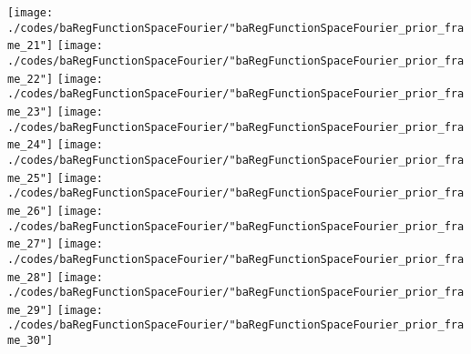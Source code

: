 \begin{frame}{\insertsection}
\begin{center}
{\begin{animateinline}{20}
				 \texttt{[image: ./codes/baRegFunctionSpaceFourier/"baRegFunctionSpaceFourier\_prior\_frame\_21"]}\newframe
				 \texttt{[image: ./codes/baRegFunctionSpaceFourier/"baRegFunctionSpaceFourier\_prior\_frame\_22"]}\newframe
				 \texttt{[image: ./codes/baRegFunctionSpaceFourier/"baRegFunctionSpaceFourier\_prior\_frame\_23"]}\newframe
				 \texttt{[image: ./codes/baRegFunctionSpaceFourier/"baRegFunctionSpaceFourier\_prior\_frame\_24"]}\newframe
				 \texttt{[image: ./codes/baRegFunctionSpaceFourier/"baRegFunctionSpaceFourier\_prior\_frame\_25"]}\newframe
				 \texttt{[image: ./codes/baRegFunctionSpaceFourier/"baRegFunctionSpaceFourier\_prior\_frame\_26"]}\newframe
				 \texttt{[image: ./codes/baRegFunctionSpaceFourier/"baRegFunctionSpaceFourier\_prior\_frame\_27"]}\newframe
				 \texttt{[image: ./codes/baRegFunctionSpaceFourier/"baRegFunctionSpaceFourier\_prior\_frame\_28"]}\newframe
				 \texttt{[image: ./codes/baRegFunctionSpaceFourier/"baRegFunctionSpaceFourier\_prior\_frame\_29"]}\newframe
				 \texttt{[image: ./codes/baRegFunctionSpaceFourier/"baRegFunctionSpaceFourier\_prior\_frame\_30"]}
			 \end{animateinline}
			}
	\end{center}
    
\end{frame}

